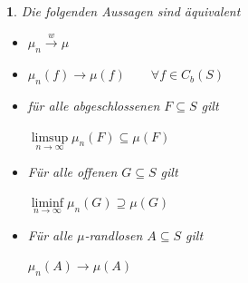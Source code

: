 \documentclass[10pt,a4paper]{report}
\numberwithin{equation}{section}
\numberwithin{figure}{section}
\theoremstyle{plain}
\theoremstyle{definition}
\theoremstyle{remark}
\theoremstyle{plain}
\newtheorem{prop}[thm]{\protect\propositionname}
\providecommand{\propositionname}{Satz}
\newcommand{\1}{ \mathbb{1} } %
\begin{document}
\begin{prop}
  Die folgenden Aussagen sind äquivalent
  \begin{itemize}
  \item[1)] $\mu_n \overset{w}{\to} \mu$
  \item[2)] $\mu_n(f) \to \mu(f) \qquad \forall f \in C_b(S)$
  \item[3)] für alle abgeschlossenen $F \subseteq S$ gilt
    \begin{center}
      $\limsup\limits_{n \to \infty} \mu_n(F) \subseteq \mu(F)$
    \end{center}
  \item[4)] Für alle offenen $G \subseteq S$ gilt
    \begin{center}
      $\liminf\limits_{n \to \infty}\mu_n(G) \supseteq \mu(G)$
    \end{center}
  \item[5)] Für alle $\mu$-randlosen $A \subseteq S$ gilt
    \begin{center}
      $\mu_n(A) \to \mu(A)$
    \end{center}
  \end{itemize}
\end{prop}
\end{document}
